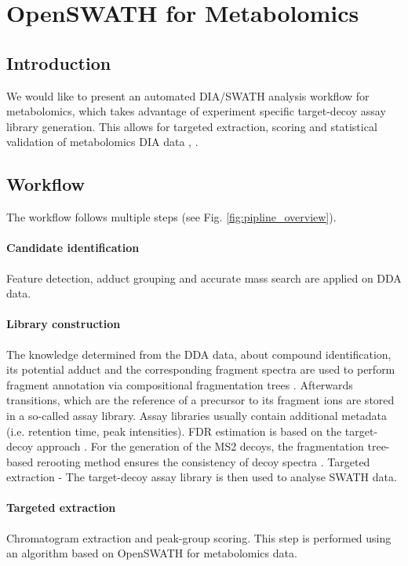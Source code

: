 \section{OpenSWATH for Metabolomics}
\subsection{Introduction}
We would like to present an automated DIA/SWATH analysis workflow for metabolomics, which takes advantage of experiment specific target-decoy assay library generation. This allows for targeted extraction, scoring and statistical validation of metabolomics DIA data \cite{Rost2014}, \cite{Teleman2015}. 

\subsection{Workflow}

The workflow follows multiple steps (see Fig. \ref{fig:pipline_overview}). 

\paragraph{Candidate identification} Feature detection, adduct grouping and accurate mass search are applied on DDA data. 
\paragraph{Library construction}  The knowledge determined from the DDA data, about  compound identification, its potential adduct and the corresponding fragment spectra are used to perform fragment annotation via compositional fragmentation trees \cite{Duhrkop2019}. Afterwards transitions, which are the reference of a precursor to its fragment ions are stored in a so-called assay library. Assay libraries usually contain additional metadata (i.e. retention time, peak intensities). FDR estimation is based on the target-decoy approach \cite{Elias2007}. For the generation of the MS2 decoys, the fragmentation tree-based rerooting method ensures the consistency of decoy spectra \cite{Scheubert2017}. Targeted extraction - The target-decoy assay library is then used to analyse SWATH data. 
\paragraph{Targeted extraction} Chromatogram extraction and peak-group scoring. This step is performed using an algorithm based on OpenSWATH \cite{Rost2014} for metabolomics data. 
